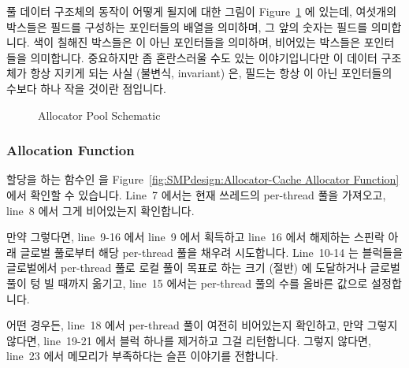 풀 데이터 구조체의 동작이 어떻게 될지에 대한 그림이
Figure~\ref{fig:SMPdesign:Allocator Pool Schematic} 에 있는데, 여섯개의
박스들은  필드를 구성하는 포인터들의 배열을 의미하며, 그 앞의 숫자는
 필드를 의미합니다.
색이 칠해진 박스들은  이 아닌 포인터들을 의미하며, 비어있는 박스들은
 포인터들을 의미합니다.
중요하지만 좀 혼란스러울 수도 있는 이야기입니다만 이 데이터 구조체가 항상
지키게 되는 사실 (불변식, invariant) 은,  필드는 항상  이 아닌
포인터들의 수보다 하나 작을 것이란 점입니다.

\begin{figure}[htb]
\begin{center}
\end{center}
\caption{Allocator Pool Schematic}
\label{fig:SMPdesign:Allocator Pool Schematic}
\end{figure}

\subsubsection{Allocation Function}

할당을 하는 함수인  을
Figure~\ref{fig:SMPdesign:Allocator-Cache Allocator Function} 에서 확인할 수
있습니다.
Line~7 에서는 현재 쓰레드의 per-thread 풀을 가져오고, line~8 에서 그게
비어있는지 확인합니다.

만약 그렇다면, line~9-16 에서 line~9 에서 획득하고 line~16 에서 해제하는 스핀락
아래 글로벌 풀로부터 해당 per-thread 풀을 채우려 시도합니다.
Line~10-14 는 블럭들을 글로벌에서 per-thread 풀로 로컬 풀이 목표로 하는 크기
(절반) 에 도달하거나 글로벌 풀이 텅 빌 때까지 옮기고, line~15 에서는 per-thread
풀의 수를 올바른 값으로 설정합니다.

어떤 경우든, line~18 에서 per-thread 풀이 여전히 비어있는지 확인하고, 만약
그렇지 않다면, line~19-21 에서 블럭 하나를 제거하고 그걸 리턴합니다.
그렇지 않다면, line~23 에서 메모리가 부족하다는 슬픈 이야기를 전합니다.
\iffalse

